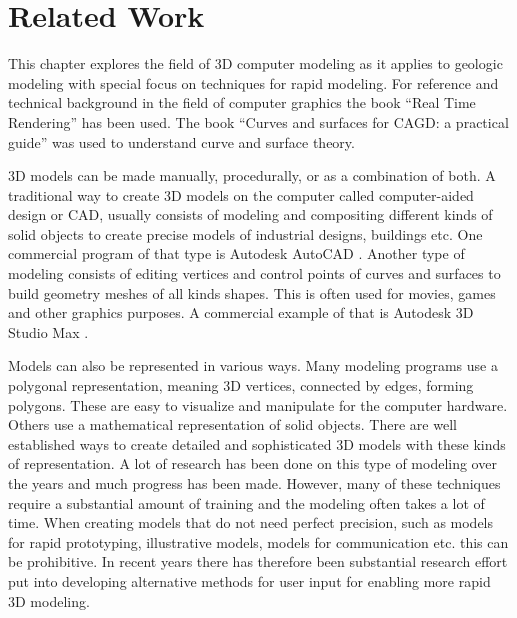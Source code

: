 \documentclass[a4paper,12pt]{report}
\begin{document}



\clearpage
\chapter{Related Work}
\label{sec:star}

This chapter explores the field of 3D computer modeling as it applies to geologic modeling with special focus on techniques for rapid modeling. For reference and technical background in the field of computer graphics the book ``Real Time Rendering'' \cite{moller2008real} has been used.  The book ``Curves and surfaces for CAGD: a practical guide'' \cite{farin2001curves} was used to understand curve and surface theory.

3D models can be made manually, procedurally, or as a combination of both. A traditional way to create 3D models on the computer called computer-aided design or CAD, usually consists of modeling and compositing different kinds of solid objects to create precise models of industrial designs, buildings etc. One commercial program of that type is Autodesk AutoCAD \cite{autocad}. Another type of modeling consists of editing vertices and control points of curves and surfaces to build geometry meshes of all kinds shapes. This is often used for movies, games and other graphics purposes. A commercial example of that is Autodesk 3D Studio Max \cite{3dsmax}.

Models can also be represented in various ways. Many modeling programs use a polygonal representation, meaning 3D vertices, connected by edges, forming polygons. These are easy to visualize and manipulate for the computer hardware.  Others use a mathematical representation of solid objects. There are well established ways to create detailed and sophisticated 3D models with these kinds of representation. A lot of research has been done on this type of modeling over the years and much progress has been made. However, many of these techniques require a substantial amount of training and the modeling often takes a lot of time. When creating models that do not need perfect precision, such as models for rapid prototyping, illustrative models, models for communication etc. this can be prohibitive. In recent years there has therefore been substantial research effort put into developing alternative methods for user input for enabling more rapid 3D modeling.
\end{document}
